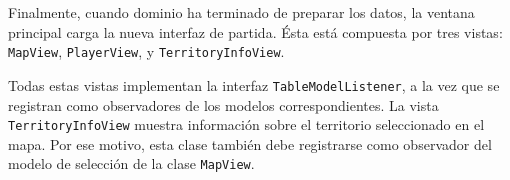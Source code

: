 Finalmente, cuando dominio ha terminado de preparar los datos, la ventana
principal carga la nueva interfaz de partida. Ésta está compuesta por tres
vistas: \texttt{MapView}, \texttt{PlayerView}, y \texttt{TerritoryInfoView}.

Todas estas vistas implementan la interfaz \texttt{TableModelListener}, a la
vez que se registran como observadores de los modelos correspondientes. La
vista \texttt{TerritoryInfoView} muestra información sobre el territorio
seleccionado en el mapa. Por ese motivo, esta clase también debe registrarse
como observador del modelo de selección de la clase \texttt{MapView}.
